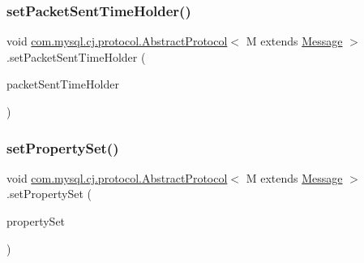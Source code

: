 \mbox{\label{classcom_1_1mysql_1_1cj_1_1protocol_1_1_abstract_protocol_a87fcaa5c3330747080a8f697672ab1ee}} 
\subsubsection{\texorpdfstring{set\+Packet\+Sent\+Time\+Holder()}{setPacketSentTimeHolder()}}
{\footnotesize\ttfamily void \mbox{\hyperlink{classcom_1_1mysql_1_1cj_1_1protocol_1_1_abstract_protocol}{com.\+mysql.\+cj.\+protocol.\+Abstract\+Protocol}}$<$ M extends \mbox{\hyperlink{interfacecom_1_1mysql_1_1cj_1_1protocol_1_1_message}{Message}} $>$.set\+Packet\+Sent\+Time\+Holder (\begin{DoxyParamCaption}\item[{\mbox{\hyperlink{interfacecom_1_1mysql_1_1cj_1_1protocol_1_1_packet_sent_time_holder}{Packet\+Sent\+Time\+Holder}}}]{packet\+Sent\+Time\+Holder }\end{DoxyParamCaption})}

\mbox{\label{classcom_1_1mysql_1_1cj_1_1protocol_1_1_abstract_protocol_ae1541b6bfdeeba4b70d410e35cf2f11e}} 
\subsubsection{\texorpdfstring{set\+Property\+Set()}{setPropertySet()}}
{\footnotesize\ttfamily void \mbox{\hyperlink{classcom_1_1mysql_1_1cj_1_1protocol_1_1_abstract_protocol}{com.\+mysql.\+cj.\+protocol.\+Abstract\+Protocol}}$<$ M extends \mbox{\hyperlink{interfacecom_1_1mysql_1_1cj_1_1protocol_1_1_message}{Message}} $>$.set\+Property\+Set (\begin{DoxyParamCaption}\item[{\mbox{\hyperlink{interfacecom_1_1mysql_1_1cj_1_1conf_1_1_property_set}{Property\+Set}}}]{property\+Set }\end{DoxyParamCaption})}



